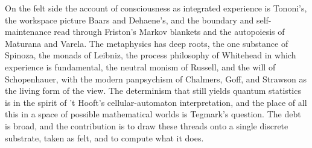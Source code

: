 On the felt side the account of consciousness as integrated experience is Tononi's, the workspace picture Baars and Dehaene's, and the boundary and self-maintenance read through Friston's Markov blankets and the autopoiesis of Maturana and Varela. The metaphysics has deep roots, the one substance of Spinoza, the monads of Leibniz, the process philosophy of Whitehead in which experience is fundamental, the neutral monism of Russell, and the will of Schopenhauer, with the modern panpsychism of Chalmers, Goff, and Strawson as the living form of the view. The determinism that still yields quantum statistics is in the spirit of 't Hooft's cellular-automaton interpretation, and the place of all this in a space of possible mathematical worlds is Tegmark's question. The debt is broad, and the contribution is to draw these threads onto a single discrete substrate, taken as felt, and to compute what it does.

